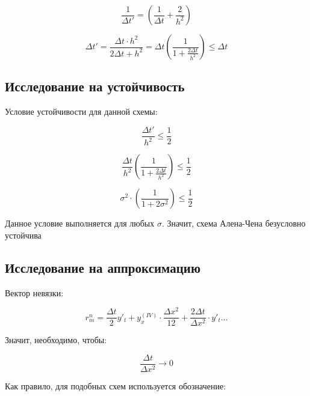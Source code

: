 \documentclass[10pt,a4paper]{article}
\begin{document}
	\begin{equation}
		\frac{1}{\Delta t'} = \left(\frac{1}{\Delta t} + \frac{2}{h^{2}}\right)
	\end{equation}
	
	\begin{equation}
		\Delta t' = \frac{\Delta t\cdot h^{2}}{2\Delta t + h^{2}} = 
		\Delta t\left(\frac{1}{1 + \frac{2\Delta t}{h^{2}}}\right) \leqslant 
		\Delta t
	\end{equation}
	
	\subsection{Исследование на устойчивость}
	
	Условие устойчивости для данной схемы:
	
	\begin{equation}
		\frac{\Delta t'}{h^{2}}\leqslant\frac{1}{2}
	\end{equation}
	
	\begin{equation}
		\frac{\Delta t}{h^{2}}\left(\frac{1}{1 + \frac{2\Delta t}{h^{2}}}\right)
		\leqslant \frac{1}{2}
	\end{equation}
	
	\begin{equation}
		\sigma^{2}\cdot\left(\frac{1}{1 + 2\sigma^{2}}\right) \leqslant \frac{1}
		{2}
	\end{equation}
	
	Данное условие выполняется для любых $\sigma$. Значит, схема Алена-Чена 
	безусловно устойчива
	
	\subsection{Исследование на аппроксимацию}
	
	Вектор невязки:
	
	\begin{equation}
		r^{n}_{m} = \frac{\Delta t}{2}y'_{t} + y^{\left(IV\right)}_{x}\cdot
		\frac{\Delta x^{2}}{12} + \frac{2\Delta t}{\Delta x^{2}}\cdot y'_{t} 
		\ldots
	\end{equation}
	
	Значит, необходимо, чтобы:
	
	\begin{equation}
		\frac{\Delta t}{\Delta x^{2}}\rightarrow 0
	\end{equation}
	
	Как правило, для подобных схем используется обозначение:
	
\end{document}

